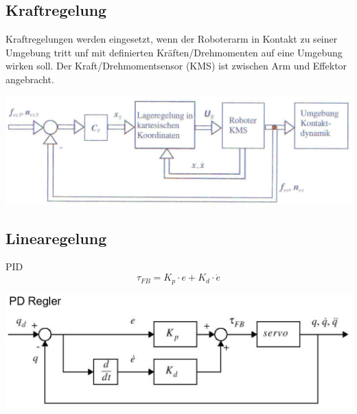 \begin{minipage}{0.5\linewidth}
    \subsection{Kraftregelung }
    Kraftregelungen werden eingesetzt, wenn der Roboterarm in Kontakt zu seiner Umgebung tritt unf mit definierten Kräften/Drehmomenten auf eine Umgebung wirken soll.
    Der Kraft/Drehmomentsensor (KMS) ist zwischen Arm und Effektor angebracht.
\end{minipage}
\begin{minipage}{0.5\linewidth}
    \includegraphics[width=\linewidth]{./bilder/KraftRegelung}
\end{minipage}

\begin{minipage}[b]{0.5\linewidth}
    \subsection{Linearegelung}
    PID 
    \[ \tau_{FB}=K_p\cdot e + K_d\cdot \dot{e} \]
\end{minipage}
\begin{minipage}{0.5\linewidth}
    \includegraphics[width=\linewidth]{./bilder/PDRegler}
\end{minipage}



